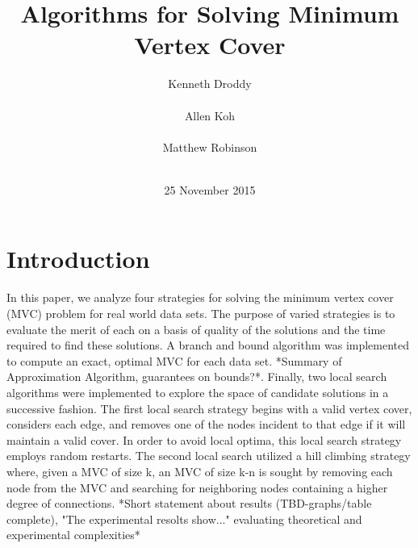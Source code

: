 \documentclass{sig-alternate-05-2015}
\begin{document}


\title{{Algorithms for Solving Minimum Vertex Cover}
}
\author{
\alignauthor
Kenneth Droddy\\
       \\
\alignauthor
Allen Koh \\
       \\
\alignauthor 
Matthew Robinson \\
       \\
}

\date{25 November 2015}

\maketitle
\begin{abstract}

\end{abstract}

\section{Introduction}
In this paper, we analyze four strategies for solving the minimum vertex cover (MVC) problem for real world data sets. The purpose of varied strategies is to evaluate the merit of each on a basis of quality of the solutions and the time required to find these solutions. A branch and bound algorithm was implemented to compute an exact, optimal MVC for each data set. *Summary of Approximation Algorithm, guarantees on bounds?*. Finally, two local search algorithms were implemented to explore the space of candidate solutions in a successive fashion. The first local search strategy begins with a valid vertex cover, considers each edge, and removes one of the nodes incident to that edge if it will maintain a valid cover. In order to avoid local optima, this local search strategy employs random restarts. The second local search utilized a hill climbing strategy where, given a MVC of size k, an MVC of size k-n is sought by removing each node from the MVC and searching for neighboring nodes containing a higher degree of connections. *Short statement about results (TBD-graphs/table complete), "The experimental resolts show..." evaluating theoretical and experimental complexities* 
\end{document}
